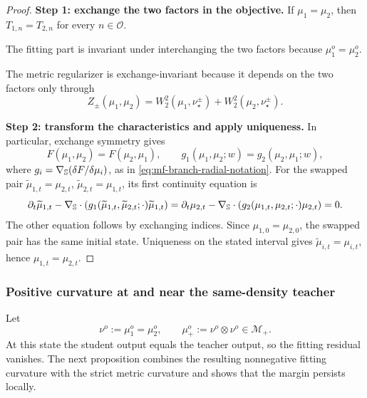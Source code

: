 \begin{proof}
\noindent\textbf{Step 1: exchange the two factors in the objective.}
If $\mu_1=\mu_2$, then $T_{1,n}=T_{2,n}$ for every $n\in \mathcal O$. 

The fitting part is invariant under interchanging the two factors because $\mu_1^o=\mu_2^o$. 

The metric regularizer is exchange-invariant because it depends on the two factors only through
\[
    Z_\pm(\mu_1,\mu_2)
    =
    W_2^2(\mu_1,\nu_\star^\pm)+W_2^2(\mu_2,\nu_\star^\pm).
\]

\par\noindent\textbf{Step 2: transform the characteristics and apply uniqueness.}
In particular, exchange symmetry gives
\[
 F(\mu_1,\mu_2)=F(\mu_2,\mu_1),\qquad
 g_1(\mu_1,\mu_2;w)=g_2(\mu_2,\mu_1;w),
\]
where \(g_i=\nabla_{\mathbb{S}}(\delta F/\delta\mu_i)\), as in
\cref{eq:mf-branch-radial-notation}. For the swapped pair
\(\widetilde\mu_{1,t}=\mu_{2,t}\), \(\widetilde\mu_{2,t}=\mu_{1,t}\),
its first continuity equation is
\[
 \partial_t\widetilde\mu_{1,t}
 -\nabla_{\mathbb{S}}\cdot
  (g_1(\widetilde\mu_{1,t},\widetilde\mu_{2,t};\cdot)\widetilde\mu_{1,t})
 =\partial_t\mu_{2,t}
 -\nabla_{\mathbb{S}}\cdot(g_2(\mu_{1,t},\mu_{2,t};\cdot)\mu_{2,t})=0.
\]
The other equation follows by exchanging indices. Since
\(\mu_{1,0}=\mu_{2,0}\), the swapped pair has the same initial state.
Uniqueness on the stated interval gives
\(\widetilde\mu_{i,t}=\mu_{i,t}\), hence \(\mu_{1,t}=\mu_{2,t}\).
\end{proof}

\subsubsection{Positive curvature at and near the same-density teacher}

Let
\begin{equation}
 \nu^o:=\mu_1^o=\mu_2^o,
 \qquad
 \mu_+^o:=\nu^o\otimes\nu^o\in\mathcal M_+.
\end{equation}
At this state the student output equals the teacher output, so the fitting
residual vanishes. The next proposition combines the resulting nonnegative
fitting curvature with the strict metric curvature and shows that the margin
persists locally.

